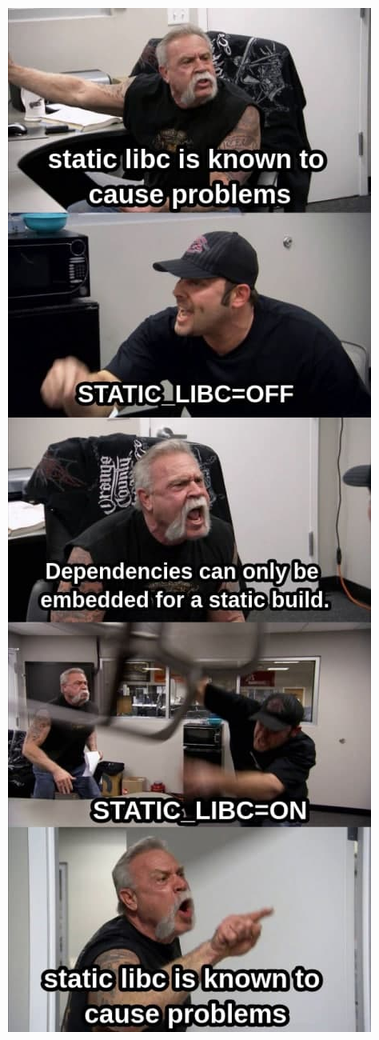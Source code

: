 \documentclass{beamer}
\begin{document}
\begin{CJK*}{UTF8}{bsmi}
  \begin{frame}
    \centering
    \includegraphics[height=\textheight]{photo_2021-08-04_02-25-37.jpg}
  \end{frame}


\end{CJK*}
\end{document}
